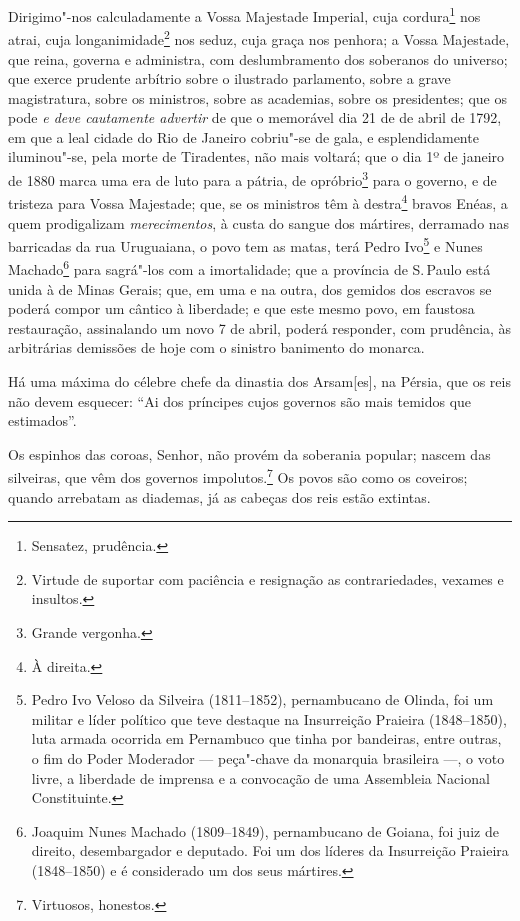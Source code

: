 Dirigimo"-nos calculadamente a Vossa Majestade Imperial, cuja
cordura\footnote{Sensatez, prudência.} nos atrai, cuja
longanimidade\footnote{Virtude de suportar com paciência e resignação
  as contrariedades, vexames e insultos.} nos seduz, cuja graça nos
penhora; a Vossa Majestade, que reina, governa e administra, com
deslumbramento dos soberanos do universo; que exerce prudente arbítrio
sobre o ilustrado parlamento, sobre a grave magistratura, sobre os
ministros, sobre as academias, sobre os presidentes; que os pode \emph{e
deve cautamente advertir} de que o memorável dia 21 de de abril de 1792,
em que a leal cidade do Rio de Janeiro cobriu"-se de gala, e
esplendidamente iluminou"-se, pela morte de Tiradentes, não mais voltará;
que o dia 1º de janeiro de 1880 marca uma era de luto para a pátria, de
opróbrio\footnote{Grande vergonha.} para o governo, e de tristeza para
Vossa Majestade; que, se os ministros têm à destra\footnote{À direita.}
bravos Enéas, a quem prodigalizam \emph{merecimentos}, à custa do sangue
dos mártires, derramado nas barricadas da rua Uruguaiana, o povo tem as
matas, terá Pedro Ivo\footnote{Pedro Ivo Veloso da Silveira
  (1811--1852), pernambucano de Olinda, foi um militar e líder político
  que teve destaque na Insurreição Praieira (1848--1850), luta armada
  ocorrida em Pernambuco que tinha por bandeiras, entre outras, o fim do
  Poder Moderador --- peça"-chave da monarquia brasileira ---, o voto livre,
  a liberdade de imprensa e a convocação de uma Assembleia Nacional
  Constituinte.} e Nunes Machado\footnote{Joaquim Nunes Machado
  (1809--1849), pernambucano de Goiana, foi juiz de direito,
  desembargador e deputado. Foi um dos líderes da Insurreição Praieira
  (1848--1850) e é considerado um dos seus mártires.} para sagrá"-los com
a imortalidade; que a província de S.\,Paulo está unida à de Minas
Gerais; que, em uma e na outra, dos gemidos dos escravos se poderá
compor um cântico à liberdade; e que este mesmo povo, em faustosa
restauração, assinalando um novo 7 de abril, poderá responder, com
prudência, às arbitrárias demissões de hoje com o sinistro banimento do
monarca.

Há uma máxima do célebre chefe da dinastia dos Arsam{[}es{]}, na Pérsia,
que os reis não devem esquecer: ``Ai dos príncipes cujos governos são
mais temidos que estimados''.

Os espinhos das coroas, Senhor, não provém da soberania popular; nascem
das silveiras, que vêm dos governos impolutos.\footnote{Virtuosos,
  honestos.} Os povos são como os coveiros; quando arrebatam as
diademas, já as cabeças dos reis estão extintas.

